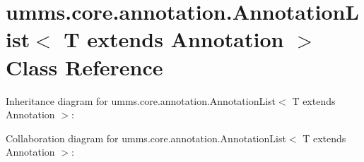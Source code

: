 \hypertarget{classumms_1_1core_1_1annotation_1_1_annotation_list_3_01_t_01extends_01_annotation_01_4}{\section{umms.\+core.\+annotation.\+Annotation\+List$<$ T extends Annotation $>$ Class Reference}
\label{classumms_1_1core_1_1annotation_1_1_annotation_list_3_01_t_01extends_01_annotation_01_4}
}


Inheritance diagram for umms.\+core.\+annotation.\+Annotation\+List$<$ T extends Annotation $>$\+:


Collaboration diagram for umms.\+core.\+annotation.\+Annotation\+List$<$ T extends Annotation $>$\+:

